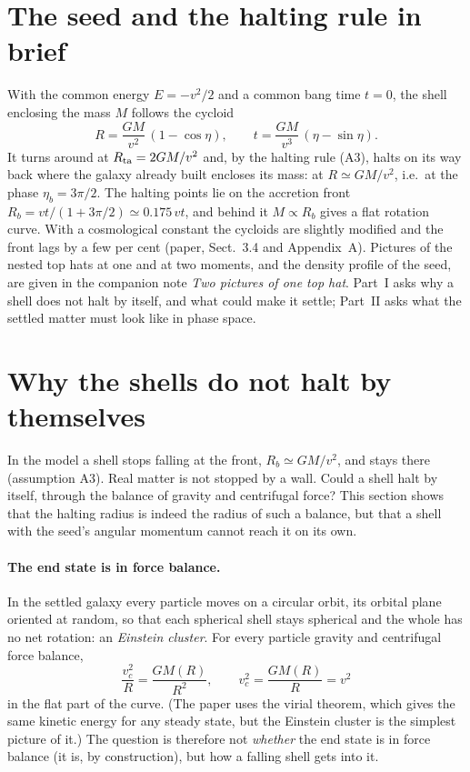 \documentclass[11pt,a4paper]{article}
\newcommand{\Rb}{R_b}
\begin{document}
\section{The seed and the halting rule in brief}

With the common energy $E=-v^2/2$ and a common bang time $t=0$, the shell enclosing
the mass $M$ follows the cycloid
\begin{equation}
  R=\frac{GM}{v^2}\,(1-\cos\eta),\qquad t=\frac{GM}{v^3}\,(\eta-\sin\eta).
  \label{eq:cycloid}
\end{equation}
It turns around at $R_{\rm ta}=2GM/v^2$ and, by the halting rule (A3), halts on its
way back where the galaxy already built encloses its mass: at $R\simeq GM/v^2$, i.e.\
at the phase $\eta_b=3\pi/2$. The halting points lie on the accretion front
$\Rb=vt/(1+3\pi/2)\simeq0.175\,vt$, and behind it $M\propto\Rb$ gives a flat
rotation curve. With a cosmological constant the cycloids are slightly modified and
the front lags by a few per cent (paper, Sect.~3.4 and Appendix~A). Pictures of the
nested top hats at one and at two moments, and the density profile of the seed, are
given in the companion note \emph{Two pictures of one top hat}. Part~I asks why a
shell does not halt by itself, and what could make it settle; Part~II asks what the
settled matter must look like in phase space.

\section{Why the shells do not halt by themselves}\label{sec:why}

In the model a shell stops falling at the front, $R_b\simeq GM/v^2$, and stays there
(assumption A3). Real matter is not stopped by a wall. Could a shell halt by
itself, through the balance of gravity and centrifugal force? This section shows
that the halting radius is indeed the radius of such a balance, but that a shell
with the seed's angular momentum cannot reach it on its own.

\paragraph{The end state is in force balance.} In the settled galaxy every particle
moves on a circular orbit, its orbital plane oriented at random, so that each
spherical shell stays spherical and the whole has no net rotation: an \emph{Einstein
cluster}. For every particle gravity and centrifugal force balance,
\begin{equation}
  \frac{v_c^2}{R}=\frac{GM(R)}{R^2},\qquad v_c^2=\frac{GM(R)}{R}=v^2
  \label{eq:balance}
\end{equation}
in the flat part of the curve. (The paper uses the virial theorem, which gives the
same kinetic energy for any steady state, but the Einstein cluster is the simplest
picture of it.) The question is therefore not \emph{whether} the end state is in
force balance (it is, by construction), but how a falling shell gets into it.
\end{document}
